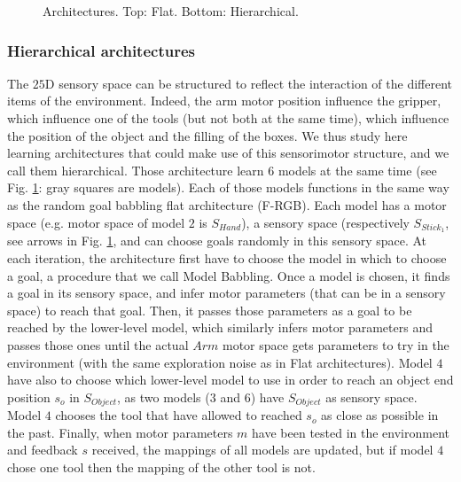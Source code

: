 \documentclass[10pt,letterpaper]{article}
\begin{document}
			\begin{figure}[t]
				\center
				
				\vspace{-0.25cm}
				
				\vspace{-0.5cm}
				\caption{Architectures. Top: Flat. Bottom: Hierarchical.}
				\label{Architectures}					
			\end{figure}
				
		
		\subsubsection{Hierarchical architectures}
			
			The $25$D sensory space can be structured to reflect the interaction of the different items of the environment.
			Indeed, the arm motor position influence the gripper, which influence one of the tools (but not both at the same time), which influence the position of the object and the filling of the boxes.
			We thus study here learning architectures that could make use of this sensorimotor structure, and we call them hierarchical.
			Those architecture learn $6$ models at the same time (see Fig. \ref{Architectures}: gray squares are models). 
			Each of those models functions in the same way as the random goal babbling flat architecture (F-RGB). 
			Each model has a motor space (e.g. motor space of model $2$ is $S_{Hand}$), a sensory space (respectively $S_{Stick_1}$, see arrows in Fig. \ref{Architectures}, and can choose goals randomly in this sensory space.
			At each iteration, the architecture first have to choose the model in which to choose a goal, a procedure that we call Model Babbling.
			Once a model is chosen, it finds a goal in its sensory space, and infer motor parameters (that can be in a sensory space) to reach that goal.
			Then, it passes those parameters as a goal to be reached by the lower-level model, 
			which similarly infers motor parameters and passes those ones until the actual $Arm$ motor space gets parameters to try in the environment (with the same exploration noise as in Flat architectures).
			Model $4$ have also to choose which lower-level model to use in order to reach an object end position $s_o$ in $S_{Object}$, as two models ($3$ and $6$) have $S_{Object}$ as sensory space. 
			Model $4$ chooses the tool that have allowed to reached $s_o$ as close as possible in the past.
			Finally, when motor parameters $m$ have been tested in the environment and feedback $s$ received, the mappings of all models are updated, but if model $4$ chose one tool then the mapping of the other tool is not.\\
			
\end{document}
